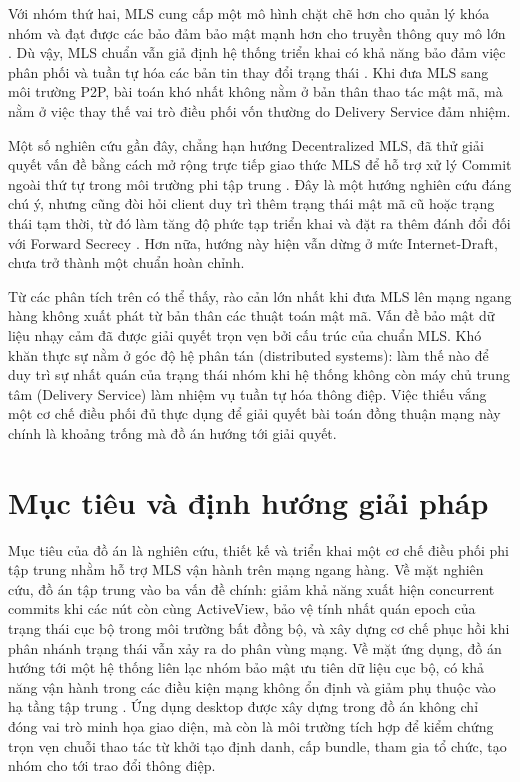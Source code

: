 \documentclass[../DoAn.tex]{subfiles}
\begin{document}
Với nhóm thứ hai, MLS cung cấp một mô hình chặt chẽ hơn cho quản lý khóa nhóm và đạt được các bảo đảm bảo mật mạnh hơn cho truyền thông quy mô lớn \cite{rfc9420}. Dù vậy, MLS chuẩn vẫn giả định hệ thống triển khai có khả năng bảo đảm việc phân phối và tuần tự hóa các bản tin thay đổi trạng thái \cite{rfc9750}. Khi đưa MLS sang môi trường P2P, bài toán khó nhất không nằm ở bản thân thao tác mật mã, mà nằm ở việc thay thế vai trò điều phối vốn thường do Delivery Service đảm nhiệm.

Một số nghiên cứu gần đây, chẳng hạn hướng Decentralized MLS, đã thử giải quyết vấn đề bằng cách mở rộng trực tiếp giao thức MLS để hỗ trợ xử lý Commit ngoài thứ tự trong môi trường phi tập trung \cite{kohbrok2025dmls}. Đây là một hướng nghiên cứu đáng chú ý, nhưng cũng đòi hỏi client duy trì thêm trạng thái mật mã cũ hoặc trạng thái tạm thời, từ đó làm tăng độ phức tạp triển khai và đặt ra thêm đánh đổi đối với Forward Secrecy \cite{alwen2023fork,kohbrok2025dmls}. Hơn nữa, hướng này hiện vẫn dừng ở mức Internet-Draft, chưa trở thành một chuẩn hoàn chỉnh.

Từ các phân tích trên có thể thấy, rào cản lớn nhất khi đưa MLS lên mạng ngang hàng không xuất phát từ bản thân các thuật toán mật mã. Vấn đề bảo mật dữ liệu nhạy cảm đã được giải quyết trọn vẹn bởi cấu trúc của chuẩn MLS. Khó khăn thực sự nằm ở góc độ hệ phân tán (distributed systems): làm thế nào để duy trì sự nhất quán của trạng thái nhóm khi hệ thống không còn máy chủ trung tâm (Delivery Service) làm nhiệm vụ tuần tự hóa thông điệp. Việc thiếu vắng một cơ chế điều phối đủ thực dụng để giải quyết bài toán đồng thuận mạng này chính là khoảng trống mà đồ án hướng tới giải quyết.

\section{Mục tiêu và định hướng giải pháp}
\label{sec:muc-tieu}

Mục tiêu của đồ án là nghiên cứu, thiết kế và triển khai một cơ chế điều phối phi tập trung nhằm hỗ trợ MLS vận hành trên mạng ngang hàng. Về mặt nghiên cứu, đồ án tập trung vào ba vấn đề chính: giảm khả năng xuất hiện concurrent commits khi các nút còn cùng ActiveView, bảo vệ tính nhất quán epoch của trạng thái cục bộ trong môi trường bất đồng bộ, và xây dựng cơ chế phục hồi khi phân nhánh trạng thái vẫn xảy ra do phân vùng mạng. Về mặt ứng dụng, đồ án hướng tới một hệ thống liên lạc nhóm bảo mật ưu tiên dữ liệu cục bộ, có khả năng vận hành trong các điều kiện mạng không ổn định và giảm phụ thuộc vào hạ tầng tập trung \cite{localfirst2019}. Ứng dụng desktop được xây dựng trong đồ án không chỉ đóng vai trò minh họa giao diện, mà còn là môi trường tích hợp để kiểm chứng trọn vẹn chuỗi thao tác từ khởi tạo định danh, cấp bundle, tham gia tổ chức, tạo nhóm cho tới trao đổi thông điệp.
\end{document}
